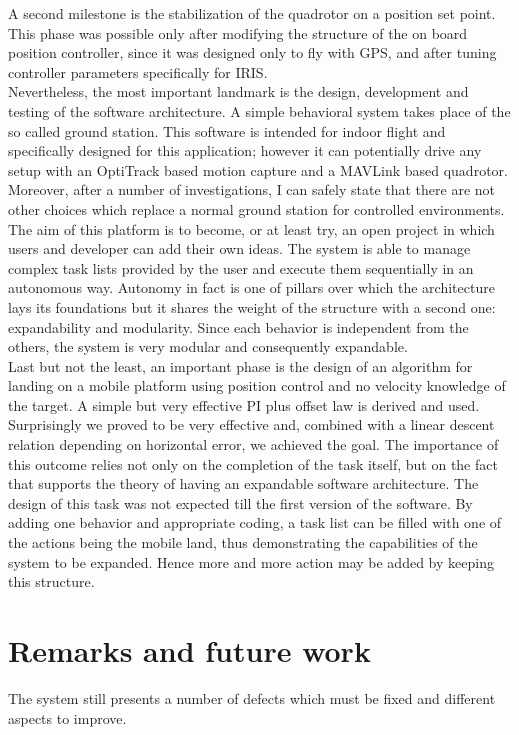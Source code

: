 A second milestone is the stabilization of the quadrotor on a position set point. This phase was possible only after modifying the structure of the on board position controller, since it was designed only to fly with GPS, and after tuning controller parameters specifically for IRIS. \\

\noindent
Nevertheless, the most important landmark is the design, development and testing of the software architecture. A simple behavioral system takes place of the so called ground station. This software is intended for indoor flight and specifically designed for this application; however it can potentially drive any setup with an OptiTrack based motion capture and a MAVLink based quadrotor. Moreover, after a number of investigations, I can safely state that there are not other choices which replace a normal ground station for controlled environments. The aim of this platform is to become, or at least try, an open project in which users and developer can add their own ideas. The system is able to manage complex task lists provided by the user and execute them sequentially in an autonomous way. Autonomy in fact is one of pillars over which the architecture lays its foundations but it shares the weight of the structure with a second one: expandability and modularity. Since each behavior is independent from the others, the system is very modular and consequently expandable. \\

\noindent
Last but not the least, an important phase is the design of an algorithm for landing on a mobile platform using position control and no velocity knowledge of the target. A simple but very effective PI plus offset law is derived and used. Surprisingly we proved to be very effective and, combined with a linear descent relation depending on horizontal error, we achieved the goal. The importance of this outcome relies not only on the completion of the task itself, but on the fact that supports the theory of having an expandable software architecture. The design of this task was not expected till the first version of the software. By adding one behavior and appropriate coding, a task list can be filled with one of the actions being the mobile land, thus demonstrating the capabilities of the system to be expanded. Hence more and more action may be added by keeping this structure.

\section*{Remarks and future work}
The system still presents a number of defects which must be fixed and different aspects to improve. \\

